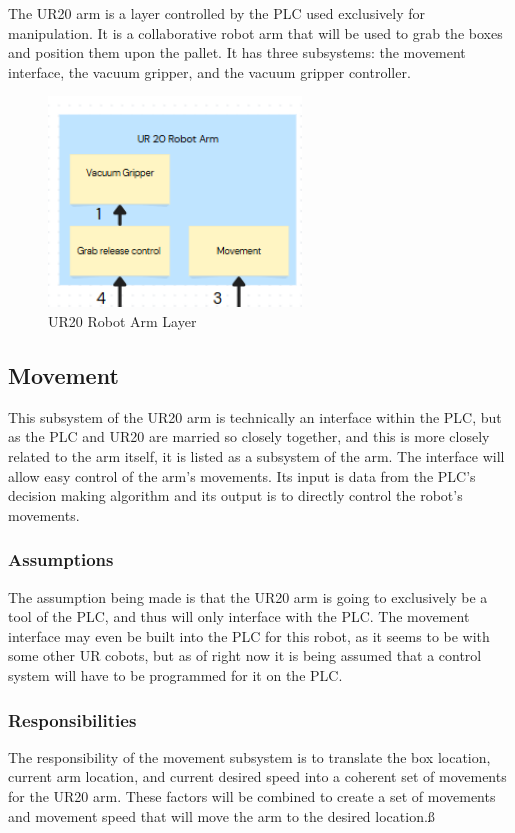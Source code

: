 The UR20 arm is a layer controlled by the PLC used exclusively for manipulation. It is a collaborative robot arm that will be used to grab the boxes and position them upon the pallet. It has three subsystems: the movement interface, the vacuum gripper, and the vacuum gripper controller.

\begin{figure}[h!]
	\centering
 	\includegraphics[width=0.60\textwidth]{images/UR20_ARM}
 \caption{UR20 Robot Arm Layer}
\end{figure}

\subsection{Movement}
This subsystem of the UR20 arm is technically an interface within the PLC, but as the PLC and UR20 are married so closely together, and this is more closely related to the arm itself, it is listed as a subsystem of the arm. The interface will allow easy control of the arm's movements. Its input is data from the PLC's decision making algorithm and its output is to directly control the robot's movements.

\subsubsection{Assumptions}
The assumption being made is that the UR20 arm is going to exclusively be a tool of the PLC, and thus will only interface with the PLC. The movement interface may even be built into the PLC for this robot, as it seems to be with some other UR cobots, but as of right now it is being assumed that a control system will have to be programmed for it on the PLC.

\subsubsection{Responsibilities}
The responsibility of the movement subsystem is to translate the box location, current arm location, and current desired speed into a coherent set of movements for the UR20 arm. These factors will be combined to create a set of movements and movement speed that will move the arm to the desired location.ß

